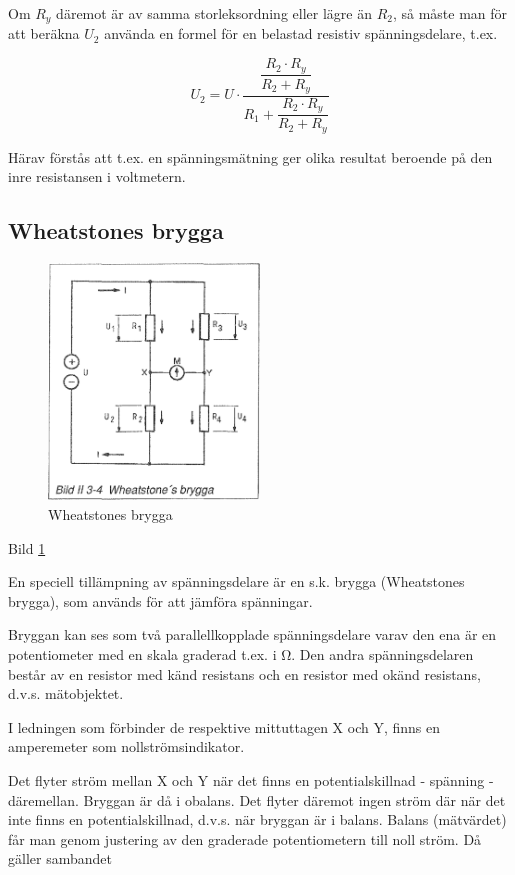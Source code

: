Om \(R_y\) däremot är av samma storleksordning eller lägre än \(R_2\), så måste
man för att beräkna \(U_2\) använda en formel för en belastad resistiv
spänningsdelare, t.ex.

\[
U_2 = U \cdot \dfrac{ \dfrac{R_2 \cdot R_y}{R_2 + R_y} }{ R_1 + \dfrac{R_2 \cdot R_y}{R_2 + R_y} }
\]

Härav förstås att t.ex. en spänningsmätning ger olika resultat beroende på den
inre resistansen i voltmetern.

\subsection{Wheatstones brygga}

\begin{figure}
\includegraphics[width=0.5\textwidth]{images/bild_2_3-04}
\caption{Wheatstones brygga}
\label{fig:BildII3-04}
\end{figure}

Bild \ref{fig:BildII3-04}

En speciell tillämpning av spänningsdelare är en s.k. brygga (Wheatstones
brygga), som används för att jämföra spänningar.

Bryggan kan ses som två parallellkopplade spänningsdelare varav den ena är en
potentiometer med en skala graderad t.ex. i Ω. Den andra spänningsdelaren består
av en resistor med känd resistans och en resistor med okänd resistans, d.v.s.
mätobjektet.

I ledningen som förbinder de respektive mittuttagen X och Y, finns en
amperemeter som nollströmsindikator.


Det flyter ström mellan X och Y när det finns en potentialskillnad - spänning -
däremellan. Bryggan är då i obalans. Det flyter däremot ingen ström där när det
inte finns en potentialskillnad, d.v.s. när bryggan är i balans. Balans
(mätvärdet) får man genom justering av den graderade potentiometern till noll
ström. Då gäller sambandet

